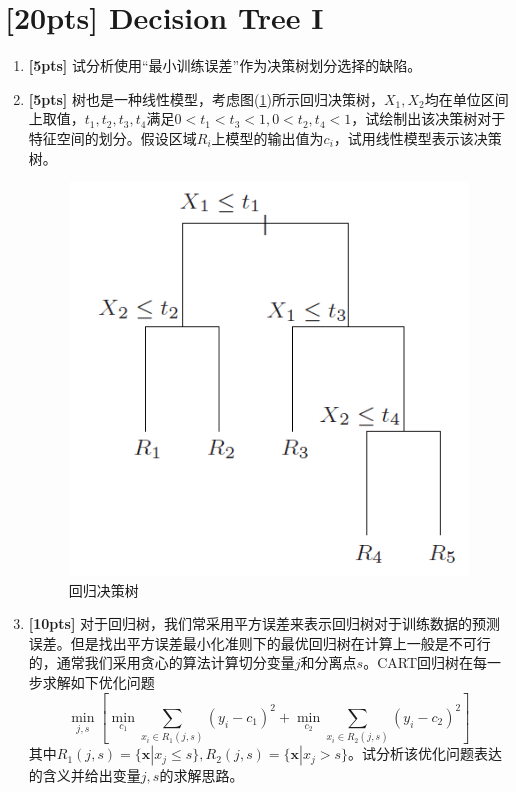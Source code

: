 \documentclass[a4paper,UTF8]{article}
\theoremstyle{definition}
\begin{document}
\newpage
\section{[20pts] Decision Tree I}
\begin{enumerate}[(1)]
	\item \textbf{[5pts]} 试分析使用“最小训练误差”作为决策树划分选择的缺陷。
	\item \textbf{[5pts]}  树也是一种线性模型，考虑图(\ref{img})所示回归决策树，$X_1,X_2$均在单位区间上取值，$t_1,t_2,t_3,t_4$满足$0<t_1<t_3<1,0<t_2,t_4<1$，试绘制出该决策树对于特征空间的划分。假设区域$R_i$上模型的输出值为$c_i$，试用线性模型表示该决策树。
	\begin{figure}[htbp]
		\centering
		\includegraphics[width=.4\textwidth]{figure/regression_tree.png} %
		\caption{回归决策树} %
		\label{img} %
	\end{figure}
	\item \textbf{[10pts]} 对于回归树，我们常采用平方误差来表示回归树对于训练数据的预测误差。但是找出平方误差最小化准则下的最优回归树在计算上一般是不可行的，通常我们采用贪心的算法计算切分变量$j$和分离点$s$。CART回归树在每一步求解如下优化问题
	$$\min _{j, s}\left[\min _{c_1} \sum_{x_{i} \in R_{1}(j, s)}\left(y_{i}-c_{1}\right)^{2}+\min _{c_{2}} \sum_{x_{i} \in R_{2}(j, s)}\left(y_{i}-c_{2}\right)^{2}\right]$$
	其中$R_1(j,s)=\{\boldsymbol{x}|x_j\leq s\},R_2(j,s)=\{\boldsymbol{x}|x_j>s\}$。试分析该优化问题表达的含义并给出变量$j,s$的求解思路。
\end{enumerate}
\end{document}

